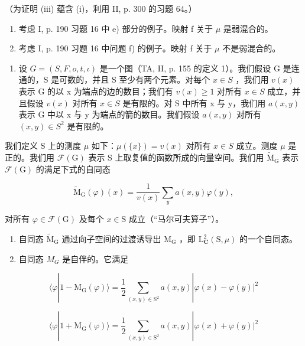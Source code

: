 （为证明 (iii) 蕴含 (i)，利用 II, p. 300 的习题 64。）

\begin{enumerate}
\def\labelenumi{\alph{enumi})}
\setcounter{enumi}{1}
\item
  考虑 I, p. 190 习题 16 中 e) 部分的例子。映射 f 关于 \(\mu\) 是弱混合的。
\item
  考虑 I, p. 190 习题 16 中问题 f) 的例子。映射 f 关于 \(\mu\) 不是弱混合的。
\end{enumerate}

\begin{enumerate}
\def\labelenumi{\arabic{enumi})}
\setcounter{enumi}{14}
\tightlist
\item
  设 \(G = (S, F, o, t, \iota)\) 是一个图（TA, II, p. 155 的定义 1）。我们假设 G 是连通的，S 是可数的，并且 S 至少有两个元素。对每个 \(x \in S\) ，我们用 \(v(x)\) 表示 G 的以 x 为端点的边的数目；我们有 \(v(x) \geqslant 1\) 对所有 \(x \in S\) 成立，并且假设 \(v(x)\) 对所有 \(x \in S\) 是有限的。对 S 中所有 x 与 y，我们用 \(a(x, y)\) 表示 G 中以 x 与 y 为端点的箭的数目。我们假设 \(a(x, y)\) 对所有 \((x, y) \in S^{2}\) 是有限的。
\end{enumerate}

我们定义 S 上的测度 \(\mu\) 如下：\(\mu(\{x\}) = v(x)\) 对所有 \(x \in S\) 成立。测度 \(\mu\) 是正的。我们用 \(\mathcal{F}(\mathrm{G})\) 表示 S 上取复值的函数所成的向量空间。我们用 \(\widetilde{\mathrm{M}}_{\mathrm{G}}\) 表示 \(\mathcal{F}(\mathrm{G})\) 的满足下式的自同态

\[
\widetilde {\mathrm{M}} _ {\mathrm{G}} (\varphi) (x) = \frac {1}{v (x)} \sum_ {y} a (x, y) \varphi (y),
\]

对所有 \(\varphi\in\mathcal{F}(\mathrm{G})\) 及每个 \(x\in\mathrm{S}\) 成立（“马尔可夫算子”）。

\begin{enumerate}
\def\labelenumi{\alph{enumi})}
\item
  自同态 \(\widetilde{\mathrm{M}}_{\mathrm{G}}\) 通过向子空间的过渡诱导出 \(\mathrm{M_G}\) ，即 \(\mathrm{L}_{\mathbf{C}}^{2}(\mathrm{S},\mu)\) 的一个自同态。
\item
  自同态 \(M_{G}\) 是自伴的。它满足
\end{enumerate}

\[
\langle \varphi | 1 - \mathrm{M} _ {\mathrm{G}} (\varphi) \rangle = \frac {1}{2} \sum_ {(x, y) \in \mathrm{S} ^ {2}} a (x, y) | \varphi (x) - \varphi (y) | ^ {2}
\]

\[
\langle \varphi | 1 + \mathrm{M} _ {\mathrm{G}} (\varphi) \rangle = \frac {1}{2} \sum_ {(x, y) \in \mathrm{S} ^ {2}} a (x, y) | \varphi (x) + \varphi (y) | ^ {2}
\]

